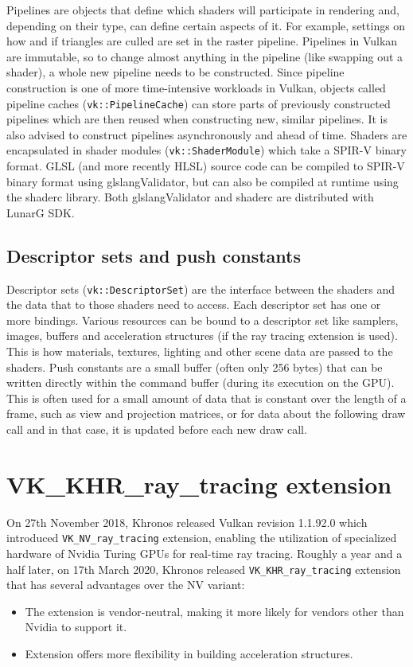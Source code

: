 \documentclass[times, utf8, zavrsni, numeric]{fer}
\begin{document}
Pipelines are objects that define which shaders will participate in rendering and, depending on their type, can define certain aspects of it. For example, settings on how and if triangles are culled are set in the raster pipeline. Pipelines in Vulkan are immutable, so to change almost anything in the pipeline (like swapping out a shader), a whole new pipeline needs to be constructed. Since pipeline construction is one of more time-intensive workloads in Vulkan, objects called pipeline caches (\texttt{vk::PipelineCache}) can store parts of previously constructed pipelines which are then reused when constructing new, similar pipelines. It is also advised to construct pipelines asynchronously and ahead of time.
Shaders are encapsulated in shader modules (\texttt{vk::ShaderModule}) which take a SPIR-V binary format. GLSL (and more recently HLSL) source code can be compiled to SPIR-V binary format using glslangValidator, but can also be compiled at runtime using the shaderc library. Both glslangValidator and shaderc are distributed with LunarG SDK.

\subsection{Descriptor sets and push constants}
Descriptor sets (\texttt{vk::DescriptorSet}) are the interface between the shaders and the data that to those shaders need to access. Each descriptor set has one or more bindings. Various resources can be bound to a descriptor set like samplers, images, buffers and acceleration structures (if the ray tracing extension is used). This is how materials, textures, lighting and other scene data are passed to the shaders.
Push constants are a small buffer (often only 256 bytes) that can be written directly within the command buffer (during its execution on the GPU). This is often used for a small amount of data that is constant over the length of a frame, such as view and projection matrices, or for data about the following draw call and in that case, it is updated before each new draw call.

\section{VK\_KHR\_ray\_tracing extension}
On 27th November 2018, Khronos released Vulkan revision 1.1.92.0 which introduced \texttt{VK\_NV\_ray\_tracing} extension, enabling the utilization of specialized hardware of Nvidia Turing GPUs for real-time ray tracing. Roughly a year and a half later, on 17th March 2020, Khronos released \texttt{VK\_KHR\_ray\_tracing} extension that has several advantages over the NV variant:
\begin{itemize}
	\item{The extension is vendor-neutral, making it more likely for vendors other than Nvidia to support it.}
	\item{Extension offers more flexibility in building acceleration structures.}
\end{itemize}
\end{document}
